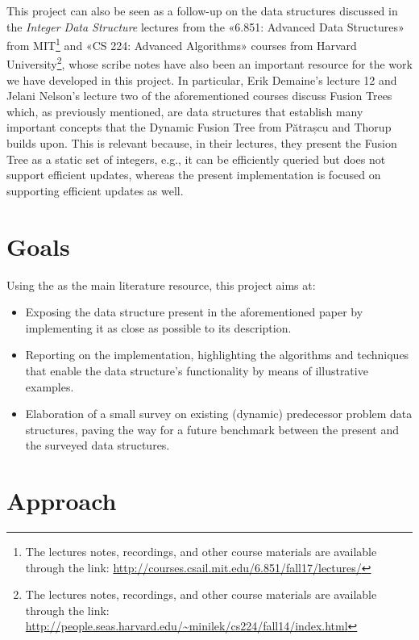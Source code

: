 This project can also be seen as a follow-up on the data structures discussed in the \textit{Integer Data Structure} lectures from the «6.851: Advanced Data Structures» from MIT\footnote{The lectures notes, recordings, and other course materials are available through the link: \url{http://courses.csail.mit.edu/6.851/fall17/lectures/}} and «CS 224: Advanced Algorithms» courses from Harvard University\footnote{The lectures notes, recordings, and other course materials are available through the link: \url{http://people.seas.harvard.edu/~minilek/cs224/fall14/index.html}}, whose scribe notes have also been an important resource for the work we have developed in this project. In particular, Erik Demaine's lecture 12 \cite{erikdemainelec12} and Jelani Nelson's lecture two \cite{nelsonjelanilec2} of the aforementioned courses discuss Fusion Trees which, as previously mentioned, are data structures that establish many important concepts that the Dynamic Fusion Tree from Pătrașcu and Thorup builds upon. 
This is relevant because, in their lectures, they present the Fusion Tree as a static set of integers, e.g., it can be efficiently queried but does not support efficient updates, whereas the present implementation is focused on supporting efficient updates as well.

\section{Goals}

Using the \cite{patrascu2014dynamic} as the main literature resource, this project aims at:
\begin{itemize}
    \item
    Exposing the data structure present in the aforementioned paper by implementing it as close as possible to its description.
    
    \item
    Reporting on the implementation, highlighting the algorithms and techniques that enable the data structure's functionality by means of illustrative examples.
    
    \item
    Elaboration of a small survey on existing (dynamic) predecessor problem data structures, paving the way for a future benchmark between the present and the surveyed data structures.
\end{itemize}

\section{Approach} %

